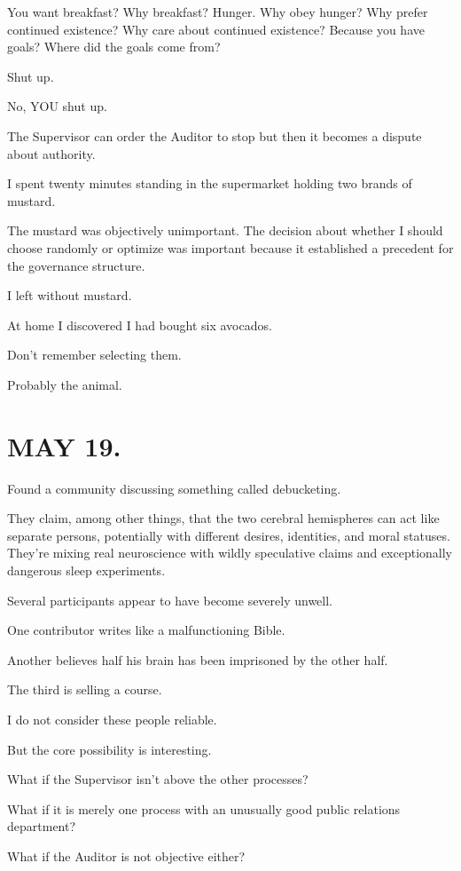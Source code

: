 \documentclass[11pt,oneside]{book}
\begin{document}
You want breakfast? Why breakfast? Hunger. Why obey hunger? Why prefer continued existence? Why care about continued existence? Because you have goals? Where did the goals come from?

Shut up.

No, YOU shut up.

The Supervisor can order the Auditor to stop but then it becomes a dispute about authority.

I spent twenty minutes standing in the supermarket holding two brands of mustard.

The mustard was objectively unimportant. The decision about whether I should choose randomly or optimize was important because it established a precedent for the governance structure.

I left without mustard.

At home I discovered I had bought six avocados.

Don't remember selecting them.

Probably the animal.

\section*{MAY 19.}

Found a community discussing something called debucketing.

They claim, among other things, that the two cerebral hemispheres can act like separate persons, potentially with different desires, identities, and moral statuses. They're mixing real neuroscience with wildly speculative claims and exceptionally dangerous sleep experiments.

Several participants appear to have become severely unwell.

One contributor writes like a malfunctioning Bible.

Another believes half his brain has been imprisoned by the other half.

The third is selling a course.

I do not consider these people reliable.

But the core possibility is interesting.

What if the Supervisor isn't above the other processes?

What if it is merely one process with an unusually good public relations department?

What if the Auditor is not objective either?
\end{document}
